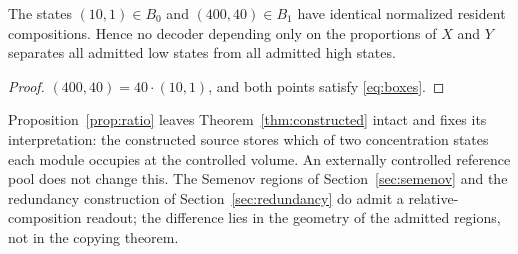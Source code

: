 \begin{proposition}\label{prop:ratio}
The states $(10,1)\in B_0$ and $(400,40)\in B_1$ have identical normalized resident compositions. Hence no decoder depending only on the proportions of $X$ and $Y$ separates all admitted low states from all admitted high states.
\end{proposition}
\begin{proof}
$(400,40)=40\cdot(10,1)$, and both points satisfy \eqref{eq:boxes}.
\end{proof}

Proposition~\ref{prop:ratio} leaves Theorem~\ref{thm:constructed} intact and fixes its interpretation: the constructed source stores which of two concentration states each module occupies at the controlled volume. An externally controlled reference pool does not change this. The Semenov regions of Section~\ref{sec:semenov} and the redundancy construction of Section~\ref{sec:redundancy} do admit a relative-composition readout; the difference lies in the geometry of the admitted regions, not in the copying theorem.

